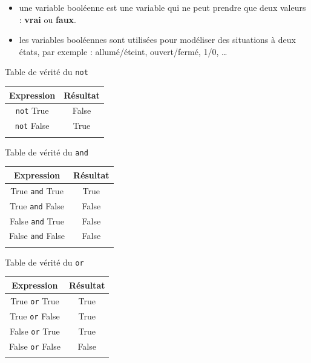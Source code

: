 \def\level{Première}  %
\def\course{NSI}
\def\chaptername{Algèbre de Boole} %
\def\docname{RD02-S}        %

\pagestyle{cours_FP}
\makeheader{} %


\begin{easybox}{}
	\begin{itemize}
		\item     une variable booléenne est une variable qui ne peut prendre que deux valeurs : \textbf{vrai} ou \textbf{faux}.
		\item     les variables booléennes sont utilisées pour modéliser des situations à deux états, par exemple : allumé/éteint, ouvert/fermé, 1/0, \ldots{}
	\end{itemize}
\end{easybox}

\begin{easybox}{}


\begin{minipage}[t]{6cm}
    \begin{center}Table de vérité du \verb+not+\end{center}
    \begin{longtable}[]{@{}cc@{}}
        \hline Expression & Résultat\tabularnewline\hline\endhead{}
        \texttt{not} True & False\tabularnewline{}
        \texttt{not} False & True\tabularnewline\hline{}
    \end{longtable}
\end{minipage}
\begin{minipage}[t]{6cm}
    \begin{center}Table de vérité du \verb+and+\end{center}
    \begin{longtable}[]{@{}cc@{}}
        \hline Expression & Résultat\tabularnewline\hline\endhead{}
        True \texttt{and} True & True\tabularnewline{}
        True \texttt{and} False & False\tabularnewline{}
        False \texttt{and} True & False\tabularnewline{}
        False \texttt{and} False & False\tabularnewline\hline{}
    \end{longtable}
\end{minipage}
\begin{minipage}[t]{6cm}
    \begin{center}Table de vérité du \verb+or+\end{center}
    \begin{longtable}[]{@{}cc@{}}
        \hline Expression & Résultat\tabularnewline\hline\endhead{}
        True \texttt{or} True & True\tabularnewline{}
        True \texttt{or} False & True\tabularnewline{}
        False \texttt{or} True & True\tabularnewline{}
        False \texttt{or} False & False\tabularnewline\hline{}
    \end{longtable}
\end{minipage}
\end{easybox}


